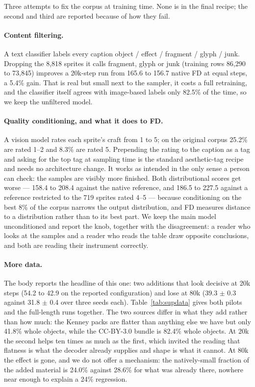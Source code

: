 \documentclass[10pt,twocolumn,letterpaper]{article}
\begin{document}
Three attempts to fix the corpus at training time. None is in the final recipe; the second and third are reported
because of how they fail.

\paragraph{Content filtering.}
A text classifier labels every caption object / effect / fragment / glyph / junk. Dropping the 8{,}818 sprites it calls
fragment, glyph or junk (training rows 86{,}290 to 73{,}845) improves a 20k-step run from 165.6 to 156.7 native FD at
equal steps, a 5.4\% gain. That is real but small next to the sampler, it costs a full retraining, and the classifier
itself agrees with image-based labels only 82.5\% of the time, so we keep the unfiltered model.

\paragraph{Quality conditioning, and what it does to FD.}
A vision model rates each sprite's craft from 1 to 5; on the original corpus 25.2\% are rated 1--2 and 8.3\% are rated
5. Prepending the rating to the caption as a tag and asking for the top tag at sampling time is the standard
aesthetic-tag recipe and needs no architecture change. It works as intended in the only sense a person can check: the
samples are visibly more finished. Both distributional scores get worse --- 158.4 to 208.4 against the native
reference, and 186.5 to 227.5 against a reference restricted to the 719 sprites rated 4--5 --- because conditioning on
the best 8\% of the corpus narrows the output distribution, and FD measures distance to a distribution rather than to
its best part. We keep the main model unconditioned and report the knob, together with the disagreement: a reader who
looks at the samples and a reader who reads the table draw opposite conclusions, and both are reading their instrument
correctly.

\paragraph{More data.}
The body reports the headline of this one: two additions that look decisive at 20k steps (54.2 to 42.9 on the reported
configuration) and lose at 80k (39.3 $\pm$ 0.3 against 31.8 $\pm$ 0.4 over three seeds each). Table~\ref{tab:supdata}
gives both pilots and the full-length runs together. The two sources differ in what they add rather than how much: the
Kenney packs are flatter than anything else we have but only 41.8\% whole objects, while the CC-BY-3.0 bundle is
82.4\% whole objects. At 20k the second helps ten times as much as the first, which invited the reading that flatness
is what the decoder already supplies and shape is what it cannot. At 80k the effect is gone, and we do not offer a
mechanism: the natively-small fraction of the added material is 24.0\% against 28.6\% for what was already there,
nowhere near enough to explain a 24\% regression.
\end{document}
